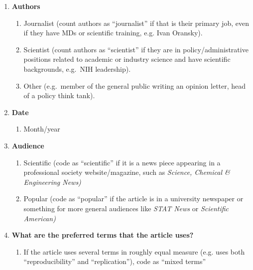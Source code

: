 \documentclass[
]{scrartcl}
\providecommand{\tightlist}{%
  \setlength{\itemsep}{0pt}\setlength{\parskip}{0pt}}
\begin{document}
\begin{enumerate}
\def\labelenumi{\arabic{enumi}.}
\item
  \textbf{Authors}

  \begin{enumerate}

  \item
    Journalist (count authors as ``journalist'' if that is their primary
    job, even if they have MDs or scientific training, e.g. Ivan
    Oransky).
  \item
    Scientist (count authors as ``scientist'' if they are in
    policy/administrative positions related to academic or industry
    science and have scientific backgrounds, e.g.~NIH leadership).
  \item
    Other (e.g.~member of the general public writing an opinion letter,
    head of a policy think tank).
  \end{enumerate}
\item
  \textbf{Date}

  \begin{enumerate}

  \tightlist
  \item
    Month/year
  \end{enumerate}
\item
  \textbf{Audience}

  \begin{enumerate}

  \item
    Scientific (code as ``scientific'' if it is a news piece appearing
    in a professional society website/magazine, such as \emph{Science,
    Chemical \& Engineering News)}
  \item
    Popular (code as ``popular'' if the article is in a university
    newspaper or something for more general audiences like \emph{STAT
    News} or \emph{Scientific American)}
  \end{enumerate}
\item
  \textbf{What are the preferred terms that the article uses?}

  \begin{enumerate}

  \tightlist
  \item
    If the article uses several terms in roughly equal measure (e.g.
    uses both ``reproducibility'' and ``replication''), code as ``mixed
    terms''
  \end{enumerate}
\end{enumerate}
\end{document}
